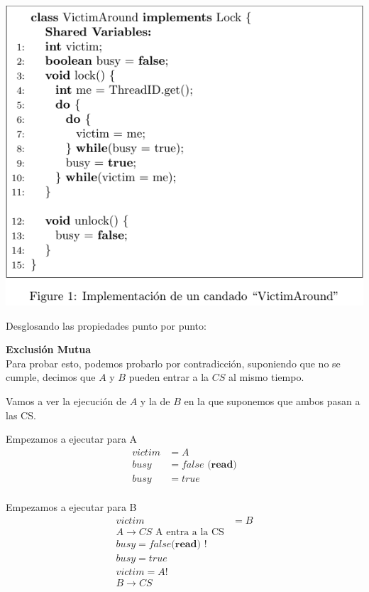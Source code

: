 \begin{enumerate}
    \begin{center}
            \includegraphics[width = 12 cm]{Images/Figure1_tarea2.png}
    \end{center}

    \hfill

    Desglosando las propiedades punto por punto:

    \textbf{Exclusión Mutua}\\

    Para probar esto, podemos probarlo por contradicción, suponiendo que no se cumple, decimos que $A$ y $B$ pueden entrar a la $CS$ al mismo tiempo.

    Vamos a ver la ejecución de $A$ y la de $B$ en la que suponemos que ambos pasan a las CS.

    Empezamos a ejecutar para A\\
    \begin{equation}
        \begin{split}
        victim &= A\\
        busy &= false\textbf{ (read)}\\
        busy &= true\\
        \end{split}
    \end{equation}

    Empezamos a ejecutar para B\\
    \begin{equation}
        \begin{split}
         victim &= B\\
         A \to CS   \text{   A entra a la CS}\\
         busy = false \textbf{(read) !}\\
         busy = true\\
         victim = A !\\
        B \to CS\\
        \end{split}
    \end{equation}


\end{enumerate}
